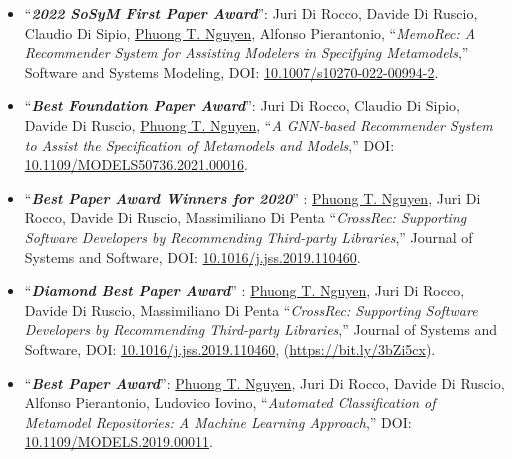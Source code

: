 \documentclass[a4paper,8pt]{article} %
\begin{document}
\begin{itemize}
	
	
	\item ``\textbf{\emph{2022 SoSyM First Paper Award}}'': Juri Di Rocco, Davide Di Ruscio, Claudio Di Sipio, \underline{Phuong T. Nguyen}, Alfonso Pierantonio, ``\emph{MemoRec: A Recommender System for Assisting Modelers in Specifying Metamodels},'' Software and Systems Modeling, DOI: \href{https://doi.org/10.1007/s10270-022-00994-2}{10.1007/s10270-022-00994-2}.
		
    \item ``\textbf{\emph{Best Foundation Paper Award}}'': Juri Di Rocco, Claudio Di Sipio, Davide Di Ruscio, \underline{Phuong T. Nguyen}, ``\emph{A GNN-based Recommender System to Assist the Specification of Metamodels and Models},'' DOI: \href{https://doi.org/10.1109/MODELS50736.2021.00016}{10.1109/MODELS50736.2021.00016}. %
	
	\item ``\textbf{\emph{Best Paper Award Winners for 2020}}''%
	: \underline{Phuong T. Nguyen}, Juri Di Rocco, Davide Di Ruscio, Massimiliano Di Penta ``\emph{CrossRec: Supporting Software Developers by Recommending Third-party Libraries},'' Journ\-al of Systems and Software, DOI: \href{https://doi.org/10.1016/j.jss.2019.110460}{10.1016/j.jss.2019.110460}.%
	
	\item ``\textbf{\emph{Diamond Best Paper Award}}''%
	: \underline{Phuong T. Nguyen}, Juri Di Rocco, Davide Di Ruscio, Massimiliano Di Penta ``\emph{CrossRec: Supporting Software Developers by Recommending Third-party Libraries},'' Journ\-al of Systems and Software, DOI: \href{https://doi.org/10.1016/j.jss.2019.110460}{10.1016/j.jss.2019.110460}, (\href{https://bit.ly/3bZi5cx}{https:\-//bit.ly/3bZi5cx}). %

    \item ``\textbf{\emph{Best Paper Award}}'': \underline{Phuong T. Nguyen}, Juri Di Rocco, Davide Di Ruscio, Alfonso Pierantonio, Ludovico Iovino, ``\emph{Automated Classification of Metamodel Repositories: A Machine Learning Approach},'' DOI: \href{https://doi.org/10.1109/MODELS.2019.00011}{10.1109/MODELS.2019.00011}.%
    

\end{itemize}
\end{document}

